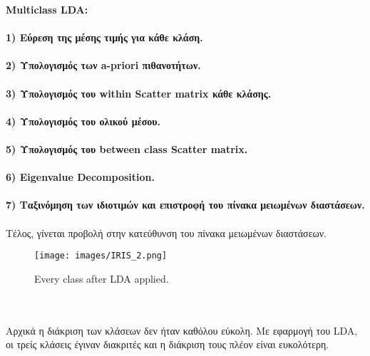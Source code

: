 \documentclass[12pt]{article}
\begin{document}
 {\bfseries Multiclass LDA:\\\\
 1) Εύρεση της μέσης τιμής για κάθε κλάση.\\\\
 2) Υπολογισμός των a-priori πιθανοτήτων.\\\\
 3) Υπολογισμός του within Scatter matrix κάθε κλάσης.\\\\
 4) Υπολογισμός του ολικού μέσου.\\\\
 5) Υπολογισμός του between class Scatter matrix.\\\\
 6) Eigenvalue Decomposition.\\\\
 7) Ταξινόμηση των ιδιοτιμών και επιστροφή του πίνακα μειωμένων διαστάσεων.\\\\}
Τέλος, γίνεται προβολή στην κατεύθυνση του πίνακα μειωμένων διαστάσεων.\\
 \begin{figure}[!h]
     \centering
     \texttt{[image: images/IRIS\_2.png]}
     \caption{Every class after LDA applied.}
     \label{fig:my_label}
 \end{figure}
\\\\Αρχικά η διάκριση των κλάσεων δεν ήταν καθόλου εύκολη. Με εφαρμογή του LDA, οι τρείς κλάσεις έγιναν διακριτές και η διάκριση τους πλέον είναι ευκολότερη.\\\\
\end{document}

